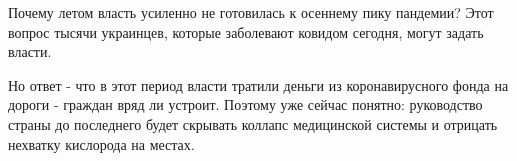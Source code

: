 Почему летом власть усиленно не готовилась к осеннему пику пандемии? Этот
вопрос тысячи украинцев, которые заболевают ковидом сегодня, могут задать
власти. 

Но ответ - что в этот период власти тратили деньги из коронавирусного фонда на
дороги - граждан вряд ли устроит. Поэтому уже сейчас понятно: руководство
страны до последнего будет скрывать коллапс медицинской системы и отрицать
нехватку кислорода на местах. 
